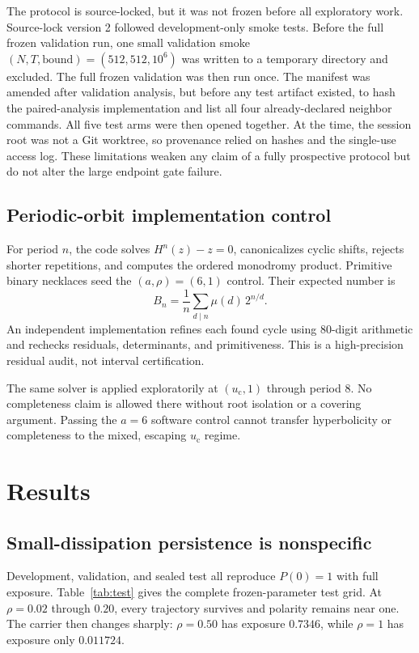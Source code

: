 \documentclass[11pt]{article}
\newcommand{\uc}{u_{\mathrm c}}
\begin{document}
The protocol is source-locked, but it was not frozen before all exploratory
work. Source-lock version 2 followed development-only
smoke tests. Before the full frozen validation run, one small validation smoke
\((N,T,\text{bound})=(512,512,10^6)\) was written to a temporary directory
and excluded. The full frozen validation was then run once. The manifest was
amended after validation analysis, but before any test artifact existed, to
hash the paired-analysis implementation and list all four already-declared
neighbor commands. All five test arms were then opened together. At the time,
the session root was not a Git worktree, so provenance relied on hashes and
the single-use access log. These limitations weaken any claim of a fully
prospective protocol but do not alter the large endpoint gate failure.

\subsection{Periodic-orbit implementation control}

For period \(n\), the code solves \(H^n(z)-z=0\), canonicalizes cyclic shifts,
rejects shorter repetitions, and computes the ordered monodromy product.
Primitive binary necklaces seed the \((a,\rho)=(6,1)\) control. Their expected
number is
\begin{equation}
B_n=\frac{1}{n}\sum_{d\mid n}\mu(d)\,2^{n/d}.
\label{eq:necklace}
\end{equation}
An independent implementation refines each found cycle using 80-digit
arithmetic and rechecks residuals, determinants, and primitiveness. This is a
high-precision residual audit, not interval certification.

The same solver is applied exploratorily at \((\uc,1)\) through period 8.
No completeness claim is allowed there without root isolation or a covering
argument. Passing the \(a=6\) software control cannot transfer hyperbolicity
or completeness to the mixed, escaping \(\uc\) regime.

\section{Results}
\label{sec:results}

\subsection{Small-dissipation persistence is nonspecific}

Development, validation, and sealed test all reproduce \(P(0)=1\) with full
exposure. Table~\ref{tab:test} gives the complete frozen-parameter test grid.
At \(\rho=0.02\) through \(0.20\), every trajectory survives and polarity
remains near one. The carrier then changes sharply: \(\rho=0.50\) has exposure
\(0.7346\), while \(\rho=1\) has exposure only \(0.011724\).
\end{document}
